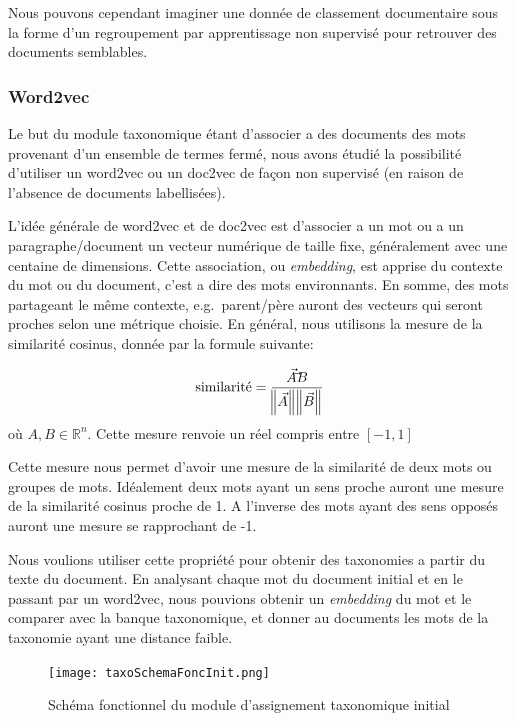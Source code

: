 Nous pouvons cependant imaginer une donnée de classement documentaire sous la forme d'un regroupement par apprentissage non supervisé pour retrouver des documents semblables.


\subsubsection{Word2vec}
Le but du module taxonomique étant d'associer a des documents des mots provenant d'un ensemble de termes fermé, nous avons étudié la possibilité d'utiliser un word2vec\cite{word2vec} ou un doc2vec de façon non supervisé (en raison de l'absence de documents labellisées).

L'idée générale de word2vec et de doc2vec est d'associer a un mot ou a un paragraphe/document un vecteur numérique de taille fixe, généralement avec une centaine de dimensions.
Cette association, ou \textit{embedding}, est apprise du contexte du mot ou du document, c'est a dire des mots environnants.
En somme, des mots partageant le même contexte, e.g.\ parent/père auront des vecteurs qui seront proches selon une métrique choisie.
En général, nous utilisons la mesure de la similarité cosinus, donnée par la formule suivante:

\begin{equation}
	\text{similarité} = \frac{\vec{A} \dot \vec{B}}{\norm{\vec{A}}\norm{\vec{B}}}
	\label{eq:distCosine}
\end{equation}
où $A, B  \in \mathbb{R}^n$. Cette mesure renvoie un réel compris entre $[-1, 1]$

Cette mesure nous permet d'avoir une mesure de la similarité de deux mots ou groupes de mots.
Idéalement deux mots ayant un sens proche auront une mesure de la similarité cosinus proche de 1.
A l'inverse des mots ayant des sens opposés auront une mesure se rapprochant de -1. 

Nous voulions utiliser cette propriété pour obtenir des taxonomies a partir du texte du document.
En analysant chaque mot du document initial et en le passant par un word2vec, nous pouvions obtenir un \textit{embedding} du mot et le comparer avec la banque taxonomique, et donner au documents les mots de la taxonomie ayant une distance faible. 

\begin{figure}[h!]
  \centering
  \texttt{[image: taxoSchemaFoncInit.png]}
	\caption[]{Schéma fonctionnel du module d'assignement taxonomique initial}
	\label{fig:taxoInit}
\end{figure}

